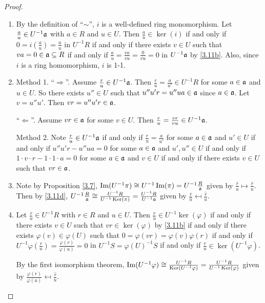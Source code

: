 \begin{proof}
    \begin{enumerate}
        \item By the definition of ``$\sim$'', $i$ is a well-defined ring monomorphism. Let $\frac{a}{u} \in U^{-1}\mathfrak{a}$ with $a \in R$ and $u \in U$. Then $\frac{a}{u} \in \ker(i)$ if and only if $0 = i(\frac{a}{u}) = \frac{a}{u}$ in $U^{-1}R$ if and only if there exists $v \in U$ such that $va = 0 \in \mathfrak{a} \subseteq R$ if and only if $\frac{a}{u} = \frac{va}{vu} = \frac{0}{vu} = 0$ in $U^{-1}\mathfrak{a}$ by \ref{3.11b}. Also, since $i$ is a ring homomorphism, $i$ is 1-1.
        \item Method 1. ``$\Rightarrow$''. Assume $\frac{r}{u} \in U^{-1}\mathfrak{a}$. Then $\frac{r}{u} = \frac{a}{u'} \in U^{-1}R$ for some $a \in \mathfrak{a}$ and $u \in U$. So there exists $u'' \in U$ such that $u''u'r = u''ua \in \mathfrak{a}$ since $a \in \mathfrak{a}$. Let $v = u''u'$. Then $vr = u''u'r \in \mathfrak{a}$. \par 
            ``$\Leftarrow$''. Assume $vr \in \mathfrak{a}$ for some $v \in U$. Then $\frac{r}{u} = \frac{vr}{vu} \in U^{-1}\mathfrak{a}$. \par 
            Method 2. Note $\frac{r}{u} \in U^{-1}\mathfrak{a}$ if and only if $\frac{r}{u} = \frac{a}{u'}$ for some $a \in \mathfrak{a}$ and $u' \in U$ if and only if $u''u'r - u''ua = 0$ for some $a \in \mathfrak{a}$ and $u', u'' \in U$ if and only if $1 \cdot v \cdot r - 1 \cdot 1 \cdot a = 0$ for some $a \in \mathfrak{a}$ and $v \in U$ if and only if there exists $v \in U$ such that $vr \in \mathfrak{a}$. 
        \item Note by Proposition \ref{3.7}, $\operatorname{Im}(U^{-1}\pi) \cong U^{-1} \operatorname{Im}(\pi) =  U^{-1}\frac{R}{\mathfrak{a}}$ given by $\frac{\overbar{r}}{\overbar{u}} \mapsto \frac{\overbar{r}}{\overbar{u}}$. Then by \ref{3.11d}, $U^{-1} \frac{R}{\mathfrak{a}} \cong \frac{U^{-1}R}{U^{-1}\operatorname{Ker}(\pi)} = \frac{U^{-1}R}{U^{-1}\mathfrak{a}}$ given by $\frac{\overbar{r}}{\overbar{u}} \mapsfrom \overline{\frac{r}{u}}$.
        \item Let $\frac{r}{u} \in U^{-1}R$ with $r \in R$ and $u \in U$. Then $\frac{r}{u} \in U^{-1}\ker(\varphi)$ if and only if there exists $v \in U$ such that $vr \in \ker(\varphi)$ by \ref{3.11b} if and only if there exists $\varphi(v) \in \varphi(U)$ such that $0 = \varphi(vr) = \varphi(v)\varphi(r)$ if and only if $U^{-1}\varphi(\frac{r}{u}) = \frac{\varphi(r)}{\varphi(u)} = 0$ in $U^{-1}S = \varphi(U)^{-1}S$ if and only if $\frac{r}{u} \in \ker(U^{-1}\varphi)$. \par 
            By the first isomorphism theorem, $\operatorname{Im}(U^{-1}\varphi) \cong \frac{U^{-1}R}{\operatorname{Ker}(U^{-1}\varphi)} = \frac{U^{-1}R}{U^{-1}\operatorname{Ker}(\varphi)}$ given by $\frac{\varphi(r)}{\varphi(u)} \mapsfrom \overline{\frac{r}{u}}$.  

\end{enumerate}
\end{proof}
